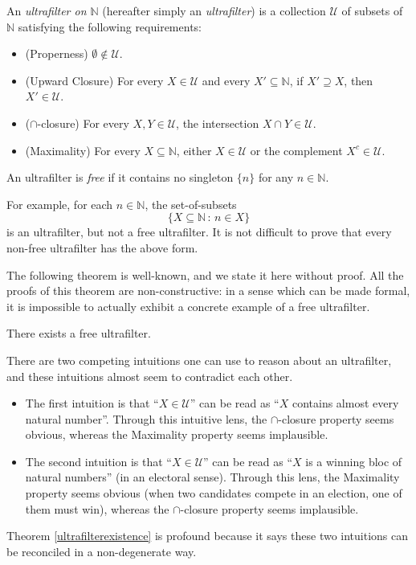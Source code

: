 \documentclass[twoside,11pt]{article}
\begin{document}
\begin{definition}
\label{ultrafilterdefn}
    An \emph{ultrafilter on $\mathbb N$} (hereafter simply an \emph{ultrafilter})
    is a collection $\mathscr U$ of subsets of $\mathbb N$ satisfying the following requirements:
    \begin{itemize}
        \item
            (Properness) $\emptyset\not\in\mathscr U$.
        \item
            (Upward Closure) For every $X\in \mathscr U$ and
            every $X'\subseteq \mathbb N$, if
            $X'\supseteq X$, then $X'\in\mathscr U$.
        \item
            ($\cap$-closure) For every $X,Y\in\mathscr U$, the
            intersection $X\cap Y\in\mathscr U$.
        \item
            (Maximality) For every $X\subseteq \mathbb N$,
            either $X\in\mathscr U$ or the complement
            $X^c\in\mathscr U$.
    \end{itemize}
    An ultrafilter is \emph{free} if it contains no singleton $\{n\}$ for any
    $n\in\mathbb N$.
\end{definition}

For example, for each $n\in\mathbb N$, the set-of-subsets
\[
\{X\subseteq\mathbb N\,:\, n\in X\}
\]
is an ultrafilter, but not a free ultrafilter.
It is not difficult to prove that every non-free ultrafilter has the above form.

The following theorem is well-known, and we state it here without proof.
All the proofs of this theorem are non-constructive: in a sense which can be
made formal, it is impossible to actually exhibit a concrete example of a
free ultrafilter.

\begin{theorem}
\label{ultrafilterexistence}
    There exists a free ultrafilter.
\end{theorem}

There are two competing intuitions one can use to reason about an ultrafilter,
and these intuitions almost seem to contradict each other.
\begin{itemize}
\item
The first intuition is
that ``$X\in\mathscr U$'' can be read as ``$X$ contains almost every natural number''. Through this intuitive lens, the $\cap$-closure property seems
obvious, whereas the Maximality property seems implausible.
\item
The second intuition is that ``$X\in\mathscr U$'' can be read as
``$X$ is a winning bloc of natural numbers'' (in an electoral sense).
Through this lens, the Maximality property seems obvious (when two candidates
compete in an election, one of them must win), whereas the $\cap$-closure property
seems implausible.
\end{itemize}
Theorem \ref{ultrafilterexistence} is
profound because it says these two
intuitions can be reconciled in a non-degenerate way.
\end{document}
